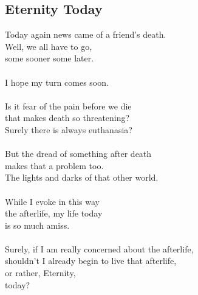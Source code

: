 \documentclass[12pt,letterpaper]{article}
\begin{document}
\begin{appendix}
\begin{subappendices}
        \subsection{Eternity Today}
        \begin{linenumbers*}
Today again news came of a friend's death. \\
Well, we all have to go, \\
some sooner some later. \\\\
I hope my turn comes soon.\\\\
Is it fear of the pain before we die \\
that makes death so threatening? \\
Surely there is always euthanasia? \\\\
But the dread of something after death \\
makes that a problem too. \\
The lights and darks of that other world.\\\\
While I evoke in this way \\
the afterlife, my life today \\
is so much amiss.\\\\
Surely, if I am really concerned about the afterlife,\\
shouldn't I already begin to live that afterlife,\\
or rather, Eternity,\\
today? \\
        \end{linenumbers*}

\end{subappendices}
\end{appendix}
\end{document}
